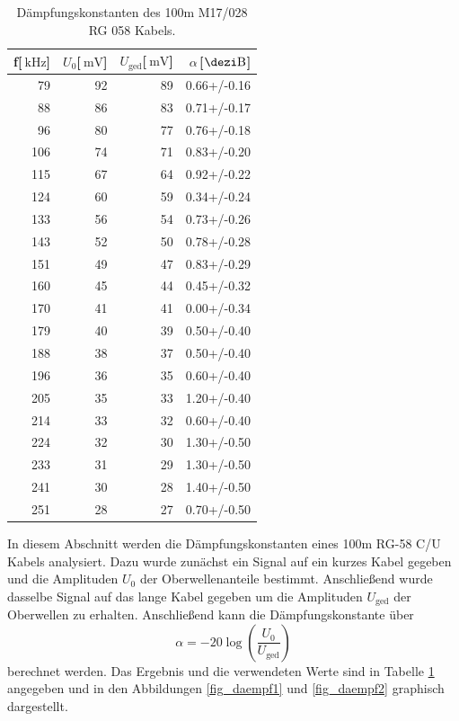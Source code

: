 \begin{table}
\centering
	\caption[]{Dämpfungskonstanten des 100m M17/028 RG 058 Kabels.}
	\begin{tabular}{r r r r}
		f[$\SI{}{\kilo\hertz}$] & $U_0$[$\SI{}{\milli\volt}$] & $U_\text{ged}$[$\SI{}{\milli\volt}$] & $\alpha$\,[$\SI{}{\dezi\bel}$]\\
		\hline \hline
			79	&	92	&	89	&	0.66+/-0.16 \\
			88	&	86	&	83	&	0.71+/-0.17 \\
			96	&	80	&	77	&	0.76+/-0.18 \\
			106	&	74	&	71	&	0.83+/-0.20 \\
			115	&	67	&	64	&	0.92+/-0.22 \\
			124	&	60	&	59	&	0.34+/-0.24 \\
			133	&	56	&	54	&	0.73+/-0.26 \\
			143	&	52	&	50	&	0.78+/-0.28 \\
			151	&	49	&	47	&	0.83+/-0.29 \\
			160	&	45	&	44	&	0.45+/-0.32 \\
			170	&	41	&	41	&	0.00+/-0.34 \\
			179	&	40	&	39	&	0.50+/-0.40 \\
			188	&	38	&	37	&	0.50+/-0.40 \\
			196	&	36	&	35	&	0.60+/-0.40 \\
			205	&	35	&	33	&	1.20+/-0.40 \\
			214	&	33	&	32	&	0.60+/-0.40 \\
			224	&	32	&	30	&	1.30+/-0.50 \\
			233	&	31	&	29	&	1.30+/-0.50 \\
			241	&	30	&	28	&	1.40+/-0.50 \\
			251	&	28	&	27	&	0.70+/-0.50\\
			\hline
	\end{tabular}
	\label{tab_daempf}
\end{table}

In diesem Abschnitt werden die Dämpfungskonstanten eines 100m RG-58 C/U Kabels analysiert.
Dazu wurde zunächst ein Signal auf ein kurzes Kabel gegeben und die Amplituden $U_0$ der Oberwellenanteile bestimmt.
Anschließend wurde dasselbe Signal auf das lange Kabel gegeben um die Amplituden $U_\text{ged}$ der Oberwellen zu erhalten.
Anschließend kann die Dämpfungskonstante über
\begin{equation}
	\alpha = -20 \log \left( \frac{U_0}{U_\text{ged}}\right)
\end{equation}
berechnet werden.
Das Ergebnis und die verwendeten Werte sind in Tabelle \ref{tab_daempf} angegeben und in den Abbildungen \ref{fig_daempf1} und \ref{fig_daempf2} graphisch dargestellt.

